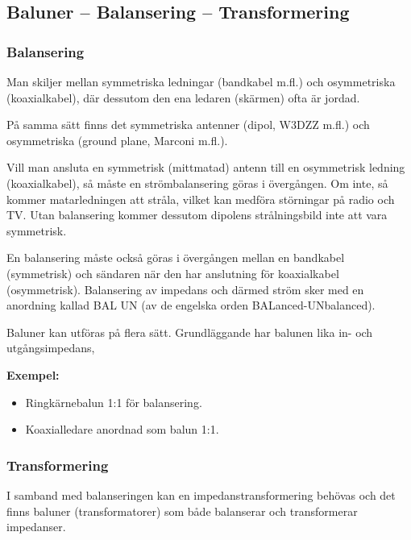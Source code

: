 \subsection{Baluner -- Balansering -- Transformering}

\subsubsection{Balansering}
\label{antenner_balansering}

Man skiljer mellan symmetriska ledningar (bandkabel m.fl.) och osymmetriska
(koaxialkabel), där dessutom den ena ledaren (skärmen) ofta är jordad.

På samma sätt finns det symmetriska antenner (dipol, W3DZZ m.fl.) och
osymmetriska (ground plane, Marconi m.fl.).

Vill man ansluta en symmetrisk (mittmatad) antenn till en osymmetrisk
ledning (koaxialkabel), så måste en strömbalansering göras i övergången.
Om inte, så kommer matarledningen att stråla, vilket kan medföra störningar på
radio och TV.
Utan balansering kommer dessutom dipolens strålningsbild inte att vara
symmetrisk.

En balansering måste också göras i övergången mellan en bandkabel (symmetrisk)
och sändaren när den har anslutning för koaxialkabel (osymmetrisk).
Balansering av impedans och därmed ström sker med en
anordning kallad BAL UN (av de engelska orden BALanced-UNbalanced).

Baluner kan utföras på flera sätt.
Grundläggande har balunen lika in- och utgångsimpedans,

\noindent
\textbf{Exempel:}
\begin{itemize}
\item Ringkärnebalun 1:1 för balansering.
\item Koaxialledare anordnad som balun 1:1.
\end{itemize}

\subsubsection{Transformering}


I samband med balanseringen kan en impedanstransformering behövas och det finns
baluner (transformatorer) som både balanserar och transformerar impedanser.

